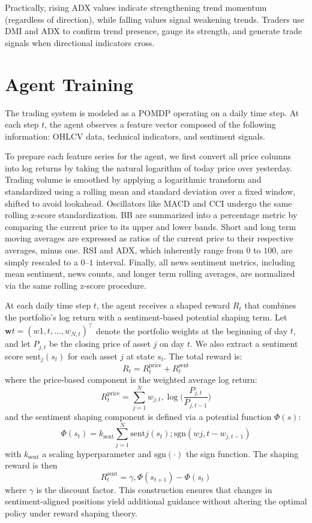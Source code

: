 Practically, rising \gls{ADX} values indicate strengthening trend momentum (regardless of direction), while falling values signal weakening trends. Traders use \gls{DMI} and \gls{ADX} to confirm trend presence, gauge its strength, and generate trade signals when directional indicators cross.

\section{Agent Training}
The trading system is modeled as a \gls{POMDP} operating on a daily time step. At each step \(t\), the agent observes a feature vector composed of the following information: \gls{OHLCV} data, technical indicators, and sentiment signals. 

To prepare each feature series for the agent, we first convert all price columns  into log returns by taking the natural logarithm of today price over yesterday. Trading volume is smoothed by applying a logarithmic transform and standardized using a rolling mean and standard deviation over a fixed window, shifted to avoid lookahead. Oscillators like \gls{MACD} and \gls{CCI} undergo the same rolling z-score standardization. \gls{BB} are summarized into a percentage metric by comparing the current price to its upper and lower bands. Short and long term moving averages are expressed as ratios of the current price to their respective averages, minus one. \gls{RSI} and \gls{ADX}, which inherently range from \(0\) to \(100\), are simply rescaled to a \(0\)–\(1\) interval. Finally, all news sentiment metrics, including mean sentiment, news counts, and longer term rolling averages, are normalized via the same rolling z-score procedure. 

At each daily time step $t$, the agent receives a shaped reward $R_t$ that combines the portfolio’s log return with a sentiment-based potential shaping term.  Let $\mathbf{w}t = (w{1,t},\dots,w_{N,t})^\top$ denote the portfolio weights at the beginning of day $t$, and let $P_{j,t}$ be the closing price of asset $j$ on day $t$.  We also extract a sentiment score $\mathrm{sent}_j(s_t)$ for each asset $j$ at state $s_t$.  The total reward is:
\[R_t = R_t^{\mathrm{price}} + R_t^{\mathrm{sent}}\]
where the price-based component is the weighted average log return:
\[R_t^{\mathrm{price}} = \sum_{j=1}^N w_{j,t} ,\log \biggl(\frac{P_{j,t}}{P_{j,t-1}}\biggr)\]
and the sentiment shaping component is defined via a potential function $\Phi(s)$:
\[\Phi(s_t) = k_{\mathrm{sent}} \sum_{j=1}^N \mathrm{sent}j(s_t) ;\mathrm{sgn}(w{j,t} - w_{j,t-1})\]
with $k_{\mathrm{sent}}$ a scaling hyperparameter and $\mathrm{sgn}(\cdot)$ the sign function.  The shaping reward is then
\[R_t^{\mathrm{sent}} = \gamma,\Phi(s_{t+1}) - \Phi(s_t)\]
where $\gamma$ is the discount factor.  This construction ensures that changes in sentiment-aligned positions yield additional guidance without altering the optimal policy under reward shaping theory.

